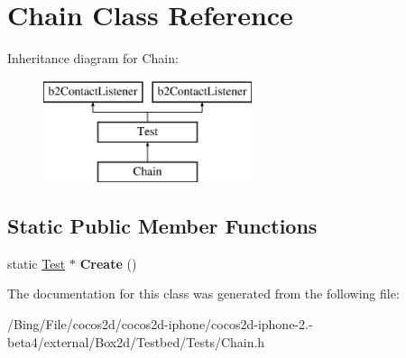 \hypertarget{class_chain}{\section{Chain Class Reference}
\label{class_chain}
}
Inheritance diagram for Chain\-:\begin{figure}[H]
\begin{center}
\leavevmode
\includegraphics[height=3.000000cm]{class_chain}
\end{center}
\end{figure}
\subsection*{Static Public Member Functions}
\begin{DoxyCompactItemize}
\item 
\hypertarget{class_chain_ab6bb11571f02c4b55fe36d524f49ce45}{static \hyperlink{class_test}{Test} $\ast$ {\bfseries Create} ()}\label{class_chain_ab6bb11571f02c4b55fe36d524f49ce45}

\end{DoxyCompactItemize}


The documentation for this class was generated from the following file\-:\begin{DoxyCompactItemize}
\item 
/\-Bing/\-File/cocos2d/cocos2d-\/iphone/cocos2d-\/iphone-\/2.-\/beta4/external/\-Box2d/\-Testbed/\-Tests/Chain.\-h\end{DoxyCompactItemize}
